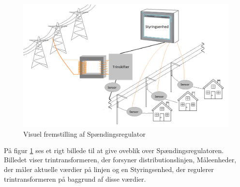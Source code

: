 \begin{figure}[H]
	\centering
	\includegraphics[width=1\textwidth]{figure/RigtBillede}
	\caption{Visuel fremstilling af Spændingsregulator}
	\label{fig:Rigtbillede}
\end{figure}

På figur \ref{fig:Rigtbillede} ses et rigt billede til at give oveblik over Spændingsregulatoren. Billedet viser trintransformeren, der forsyner distributionslinjen, Måleenheder, der måler aktuelle værdier på linjen og en Styringsenhed, der regulerer trintransformeren på baggrund af disse værdier. 